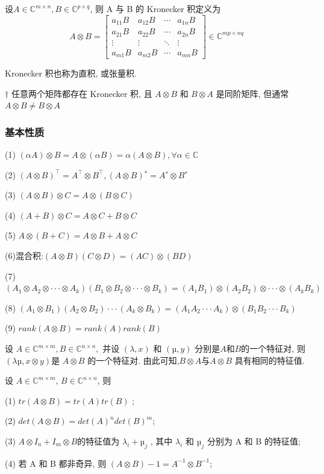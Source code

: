 \documentclass[12pt,a4paper]{article}
\begin{document}
\begin{definition}
	设$A \in \mathbb{C}^{m \times n}, B \in \mathbb{C}^{p \times q}$, 则 A 与 B 的 Kronecker 积定义为
	$$
	A \otimes B=\left[\begin{array}{cccc}{a_{11} B} & {a_{12} B} & {\cdots} & {a_{1 n} B} \\ {a_{21} B} & {a_{22} B} & {\cdots} & {a_{2 n} B} \\ {\vdots} & {\vdots} & {\ddots} & {\vdots} \\ {a_{m 1} B} & {a_{m 2} B} & {\cdots} & {a_{m n} B}\end{array}\right] \in \mathbb{C}^{m p \times n q}
	$$
	
	Kronecker 积也称为直积, 或张量积.
\end{definition}


† 任意两个矩阵都存在 Kronecker 积, 且 $A ⊗ B$ 和 $B ⊗ A$ 是同阶矩阵,
但通常 $A \otimes B \neq B \otimes A$



\subsubsection{基本性质}

(1) $(αA) ⊗ B = A ⊗ (αB) = α(A ⊗ B), ∀ α ∈ \mathbb{C}$

(2) $(A ⊗ B)^{⊺} = A^{⊺} ⊗ B^{⊺}, (A ⊗ B)^{∗} = A^{∗} ⊗ B^{∗}$

(3) $(A ⊗ B) ⊗ C = A ⊗ (B ⊗ C)$

(4) $(A + B) ⊗ C = A ⊗ C + B ⊗ C$

(5) $A ⊗ (B + C) = A ⊗ B + A ⊗ C$

(6)混合积:$ (A ⊗ B)(C ⊗ D) = (AC) ⊗ (BD)$

(7) $(A_1 ⊗ A_2 ⊗ · · · ⊗ A_k)(B_1 ⊗ B_2 ⊗ · · · ⊗ B_k)
= (A_1B_1) ⊗ (A_2B_2) ⊗ · · · ⊗ (A_kB_k)$

(8) $(A_1 ⊗ B_1)(A_2 ⊗ B_2)· · ·(A_k ⊗ B_k)
= (A_1A_2 · · · A_k) ⊗ (B_1B_2 · · · B_k)$

(9) $rank(A ⊗ B) = rank(A)rank(B)$




\begin{theorem}
	设 $A ∈ \mathbb{C}^{m×m}, B ∈ \mathbb{C}^{n×n},$ 并设 $(λ, x)$ 和 $(µ, y)$ 分别是$ A $和$ B $的一个特征对, 则 $(λµ, x ⊗ y) $是 $A ⊗ B$ 的一个特征对. 由此可知,$ B ⊗ A $与$A ⊗ B$ 具有相同的特征值.	
\end{theorem}



\begin{theorem}
	设 $A ∈ \mathbb{C}^{m×m}$, $B ∈ \mathbb{C}^{n×n}$, 则
	
	(1) $tr(A ⊗ B) = tr(A)tr(B)$ ;
	
	(2) $det(A ⊗ B) = det(A)^n det(B)^m $;
	
	(3) $A ⊗ I_n + I_m ⊗ B $的特征值为 $λ_i + µ_j$ , 其中 $λ_i$ 和 $µ_j$ 分别为 A 和 B 的特征值;
	
	(4) 若 A 和 B 都非奇异, 则 $(A ⊗ B)−1 = A^{−1} ⊗ B^{−1}$;	
\end{theorem}
\end{document}
